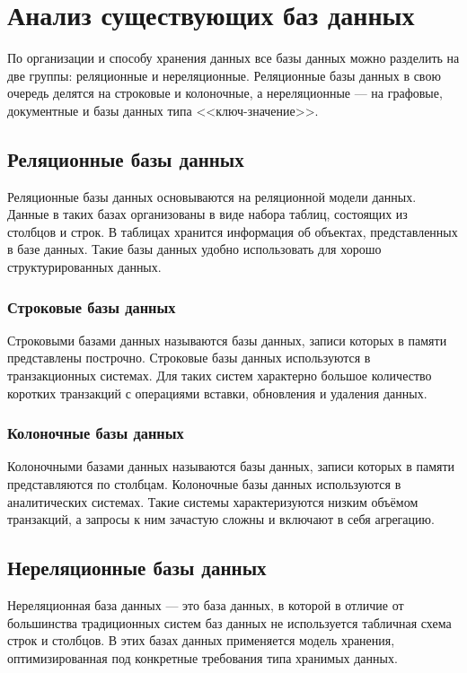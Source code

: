 \section{Анализ существующих баз данных}

По организации и способу хранения данных все базы данных можно разделить на две группы: реляционные и нереляционные. Реляционные базы данных в свою очередь делятся на строковые и колоночные, а нереляционные --- на графовые, документные и базы данных типа <<ключ-значение>>.

\subsection{Реляционные базы данных}

Реляционные базы данных основываются на реляционной модели данных. Данные в таких базах организованы в виде набора таблиц, состоящих из столбцов и строк. В таблицах хранится информация об объектах, представленных в базе данных. Такие базы данных удобно использовать для хорошо структурированных данных.

\subsubsection{Строковые базы данных}

Строковыми базами данных называются базы данных, записи которых в памяти представлены построчно. Строковые базы данных используются в транзакционных системах. Для таких систем характерно большое количество коротких транзакций с операциями вставки, обновления и удаления данных.

\subsubsection{Колоночные базы данных}

Колоночными базами данных называются базы данных, записи которых в памяти представляются по столбцам. Колоночные базы данных используются в аналитических системах. Такие системы характеризуются низким объёмом транзакций, а запросы к ним зачастую сложны и включают в себя агрегацию.

\subsection{Нереляционные базы данных}

Нереляционная база данных --- это база данных, в которой в отличие от большинства традиционных систем баз данных не используется табличная схема строк и столбцов. В этих базах данных применяется модель хранения, оптимизированная под конкретные требования типа хранимых данных.

